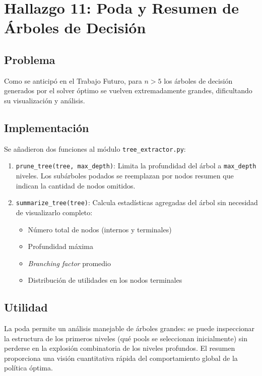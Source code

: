 \documentclass[11pt, a4paper]{article}
\begin{document}
\section{Hallazgo 11: Poda y Resumen de \'Arboles de Decisi\'on}

\subsection{Problema}
Como se anticip\'o en el Trabajo Futuro, para $n > 5$ los \'arboles de
decisi\'on generados por el solver \'optimo se vuelven extremadamente grandes,
dificultando su visualizaci\'on y an\'alisis.

\subsection{Implementaci\'on}
Se a\~nadieron dos funciones al m\'odulo \texttt{tree\_extractor.py}:

\begin{enumerate}[nosep]
    \item \texttt{prune\_tree(tree, max\_depth)}: Limita la profundidad del
    \'arbol a \texttt{max\_depth} niveles. Los sub\'arboles podados se reemplazan
    por nodos resumen que indican la cantidad de nodos omitidos.

    \item \texttt{summarize\_tree(tree)}: Calcula estad\'isticas agregadas del
    \'arbol sin necesidad de visualizarlo completo:
    \begin{itemize}[nosep]
        \item N\'umero total de nodos (internos y terminales)
        \item Profundidad m\'axima
        \item \textit{Branching factor} promedio
        \item Distribuci\'on de utilidades en los nodos terminales
    \end{itemize}
\end{enumerate}

\subsection{Utilidad}
La poda permite un an\'alisis manejable de \'arboles grandes: se puede
inspeccionar la estructura de los primeros niveles (qu\'e pools se seleccionan
inicialmente) sin perderse en la explosi\'on combinatoria de los niveles
profundos. El resumen proporciona una visi\'on cuantitativa r\'apida del
comportamiento global de la pol\'itica \'optima.
\end{document}
